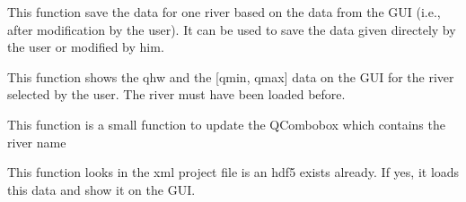 \documentclass[letterpaper,10pt,english]{sphinxmanual}
\begin{document}
\begin{fulllineitems}
\begin{fulllineitems}
\end{fulllineitems}


\begin{fulllineitems}
\label{\detokenize{index:src_GUI.fstress_GUI.FstressW.save_river_data}}
This function save the data for one river based on the data from the GUI (i.e., after modification by the user).
It can be used to save the data given directely by the user or modified by him.

\end{fulllineitems}


\begin{fulllineitems}
\label{\detokenize{index:src_GUI.fstress_GUI.FstressW.show_data_one_river}}
This function shows the qhw and the {[}qmin, qmax{]} data on the GUI for the river selected by the user.
The river must have been loaded before.

\end{fulllineitems}


\begin{fulllineitems}
\label{\detokenize{index:src_GUI.fstress_GUI.FstressW.update_list_riv}}
This function is a small function to update the QCombobox which contains the river name

\end{fulllineitems}


\begin{fulllineitems}
\label{\detokenize{index:src_GUI.fstress_GUI.FstressW.was_loaded_before}}
This function looks in the xml project file is an hdf5 exists already. If yes, it loads this data
and show it on the GUI.

\end{fulllineitems}


\end{fulllineitems}
\end{document}
